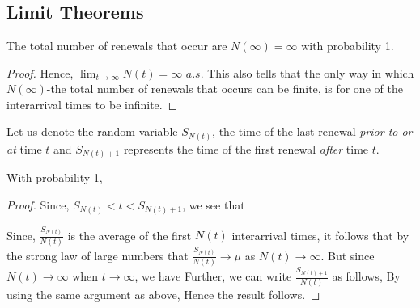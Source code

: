 \documentclass[all-lectures.tex]{subfiles}
\author{}
\begin{document}
\setcounter{chapter}{2}
\setcounter{section}{2}
\section*{}

\subsection{Limit Theorems}
\begin{prop}
The total number of renewals that occur are $N(\infty)=\infty$ with probability 1.
\end{prop}
\begin{proof}
Hence, $\lim_{t\to\infty} N(t) = \infty$ $a.s$.
This also tells that the only way in which $N(\infty)$-the total number of renewals that occurs can be finite, is for one of the interarrival times to be infinite.
\end{proof}

Let us denote the random variable $S_{N(t)}$, the time of the last renewal \textit{prior to or at} time $t$ and $S_{N(t)+1}$ represents the time of the first renewal \textit{after} time $t$.

\begin{prop}
With probability 1,
\end{prop}

\begin{proof}
Since, $S_{N(t)} < t < S_{N(t)+1}$, we see that

Since, $\frac{S_{N(t)}}{N(t)}$ is the average of the first $N(t)$ interarrival times, it follows that by the strong law of large numbers that 
$\frac{S_{N(t)}}{N(t)} \to \mu$ as $N(t) \to \infty$. But since $N(t)\to \infty$ when $t \to \infty$, we have
Further, we can write $\frac{S_{N(t)+1}}{N(t)}$ as follows,
By using the same argument as above,
Hence the result follows.
\end{proof}
\end{document}
